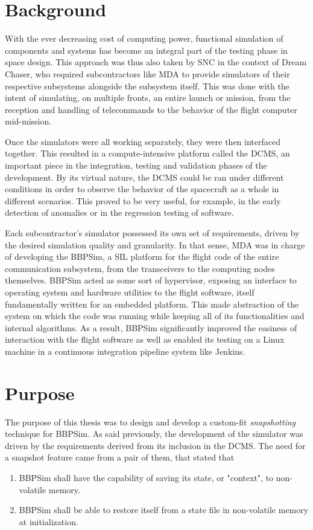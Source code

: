 \section{Background}\label{sec:intro-background}
With the ever decreasing cost of computing power, functional simulation of components and systems has become an integral part of the testing phase in space design. This approach was thus also taken by \gls{SNC} in the context of Dream Chaser, who required subcontractors like \gls{MDA} to provide simulators of their respective subsystems alongside the subsystem itself. This was done with the intent of simulating, on multiple fronts, an entire launch or mission, from the reception and handling of telecommands to the behavior of the flight computer mid-mission. 

Once the simulators were all working separately, they were then interfaced together. This resulted in a compute-intensive platform called the \gls{DCMS}, an important piece in the integration, testing and validation phases of the development. By its virtual nature, the \gls{DCMS} could be ran under different conditions in order to observe the behavior of the spacecraft as a whole in different scenarios. This proved to be very useful, for example, in the early detection of anomalies or in the regression testing of software.

Each subcontractor's simulator possessed its own set of requirements, driven by the desired simulation quality and granularity. In that sense, \gls{MDA} was in charge of developing the \gls{BBPSim}, a \gls{SIL} platform for the flight code of the entire communication subsystem, from the transceivers to the computing nodes themselves. \gls{BBPSim} acted as some sort of hypervisor, exposing an interface to operating system and hardware utilities to the flight software, itself fundamentally written for an embedded platform. This made abstraction of the system on which the code was running while keeping all of its functionalities and internal algorithms. As a result, \gls{BBPSim} significantly improved the easiness of interaction with the flight software as well as enabled its testing on a Linux machine in a continuous integration pipeline system like Jenkins.

\section{Purpose}
The purpose of this thesis was to design and develop a custom-fit \textit{snapshotting} technique for \gls{BBPSim}. As said previously, the development of the simulator was driven by the requirements derived from its inclusion in the DCMS. The need for a snapshot feature came from a pair of them, that stated that
\begin{enumerate}
	\item \gls{BBPSim} shall have the capability of saving its state, or "context", to non-volatile memory.
	\item \gls{BBPSim} shall be able to restore itself from a state file in non-volatile memory at initialization.
\end{enumerate} 

